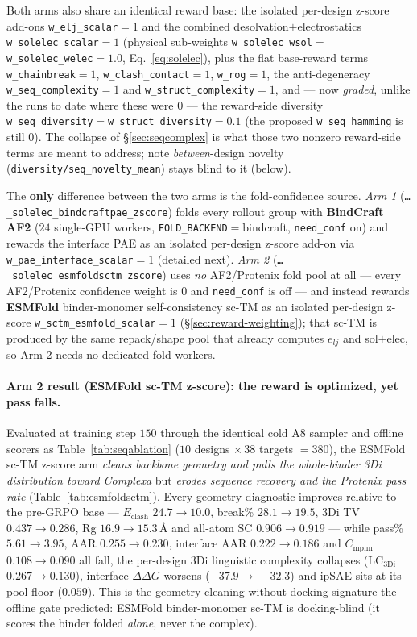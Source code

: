 \documentclass[11pt]{article}
\newcommand{\ttk}[1]{\texttt{\small #1}}
\begin{document}
Both arms also share an identical reward base: the isolated per-design z-score add-ons
\ttk{w\_elj\_scalar}$=1$ and the combined desolvation$+$electrostatics \ttk{w\_solelec\_scalar}$=1$
(physical sub-weights \ttk{w\_solelec\_wsol}$=$\ttk{w\_solelec\_welec}$=1.0$, Eq.~\ref{eq:solelec}),
plus the flat base-reward terms \ttk{w\_chainbreak}$=1$, \ttk{w\_clash\_contact}$=1$, \ttk{w\_rog}$=1$,
the anti-degeneracy \ttk{w\_seq\_complexity}$=1$ and \ttk{w\_struct\_complexity}$=1$, and --- now
\emph{graded}, unlike the runs to date where these were $0$ --- the reward-side diversity
\ttk{w\_seq\_diversity}$=$\ttk{w\_struct\_diversity}$=0.1$ (the proposed \ttk{w\_seq\_hamming} is still
$0$). The collapse of \S\ref{sec:seqcomplex} is what those two nonzero reward-side terms are meant to
address; note \emph{between}-design novelty (\ttk{diversity/seq\_novelty\_mean}) stays blind to it
(below).

The \textbf{only} difference between the two arms is the fold-confidence source.
\emph{Arm 1} (\ttk{\ldots\_solelec\_bindcraftpae\_zscore}) folds every rollout group with \textbf{BindCraft
AF2} ($24$ single-GPU workers, \ttk{FOLD\_BACKEND}$=$bindcraft, \ttk{need\_conf} on) and rewards the
interface PAE as an isolated per-design z-score add-on via \ttk{w\_pae\_interface\_scalar}$=1$ (detailed next). \emph{Arm 2}
(\ttk{\ldots\_solelec\_esmfoldsctm\_zscore}) uses \emph{no} AF2/Protenix fold pool at all --- every
AF2/Protenix confidence weight is $0$ and \ttk{need\_conf} is off --- and instead rewards
\textbf{ESMFold} binder-monomer self-consistency sc-TM as an isolated per-design z-score
\ttk{w\_sctm\_esmfold\_scalar}$=1$ (\S\ref{sec:reward-weighting}); that sc-TM is produced by the same
repack/shape pool that already computes $e_{lj}$ and sol$+$elec, so Arm 2 needs no dedicated fold
workers.

\paragraph{Arm 2 result (ESMFold sc-TM z-score): the reward is optimized, yet pass falls.} Evaluated at
training step $150$ through the identical cold A8 sampler and offline scorers as
Table~\ref{tab:seqablation} ($10$ designs $\times\,38$ targets $=380$), the ESMFold sc-TM z-score arm
\emph{cleans backbone geometry and pulls the whole-binder 3Di distribution toward Complexa} but
\emph{erodes sequence recovery and the Protenix pass rate} (Table~\ref{tab:esmfoldsctm}). Every geometry
diagnostic improves relative to the pre-GRPO base --- $E_{\mathrm{clash}}$ $24.7\!\to\!10.0$, break\%
$28.1\!\to\!19.5$, 3Di TV $0.437\!\to\!0.286$, Rg $16.9\!\to\!15.3$\,\AA{} and all-atom SC
$0.906\!\to\!0.919$ --- while pass\% $5.61\!\to\!3.95$, AAR $0.255\!\to\!0.230$, interface AAR
$0.222\!\to\!0.186$ and $C_{\mathrm{mpnn}}$ $0.108\!\to\!0.090$ all fall, the per-design 3Di linguistic
complexity collapses ($\mathrm{LC}_{\mathrm{3Di}}$ $0.267\!\to\!0.130$), interface $\Delta\Delta G$
worsens ($-37.9\!\to\!-32.3$) and ipSAE sits at its pool floor ($0.059$). This is the
geometry-cleaning-without-docking signature the offline gate predicted: ESMFold binder-monomer sc-TM is
docking-blind (it scores the binder folded \emph{alone}, never the complex).
\end{document}

